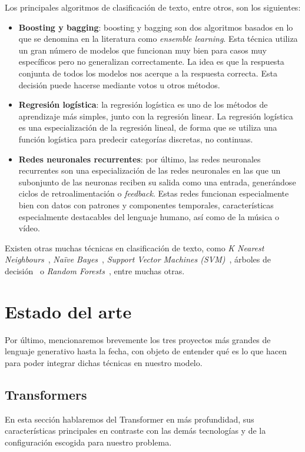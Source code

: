 Los principales algoritmos de clasificación de texto, entre otros, son los siguientes:

\begin{itemize}
    \item \textbf{Boosting y bagging}: boosting y bagging son dos algoritmos basados en lo que se denomina en la literatura como \textit{ensemble learning}. Esta técnica utiliza un gran número de modelos que funcionan muy bien para casos muy específicos pero no generalizan correctamente. La idea es que la respuesta conjunta de todos los modelos nos acerque a la respuesta correcta. Esta decisión puede hacerse mediante votos u otros métodos. \cite{Bauer2004AnEC}
    \item \textbf{Regresión logística}: la regresión logística es uno de los métodos de aprendizaje más simples, junto con la regresión linear. La regresión logística es una especialización de la regresión lineal, de forma que se utiliza una función logística para predecir categorías discretas, no continuas. \cite{CoxLogit1989}
    \item \textbf{Redes neuronales recurrentes}: por último, las redes neuronales recurrentes son una especialización de las redes neuronales en las que un subonjunto de las neuronas reciben su salida como una entrada, generándose ciclos de retroalimentación o \textit{feedback}. Estas redes funcionan especialmente bien con datos con patrones y componentes temporales, características especialmente destacables del lenguaje humano, así como de la música o vídeo. \cite{ZhouLSTM}
\end{itemize}


Existen otras muchas técnicas en clasificación de texto, como \textit{K Nearest Neighbours}~\cite{KNNXiao2007}, \textit{Naïve Bayes}~\cite{FrankNaive2006}, \textit{Support Vector Machines (SVM)}~\cite{SVMJoa1998}, árboles de decisión~\cite{DecisionTreeNoorman2018} o \textit{Random Forests}~\cite{breiman2001random}, entre muchas otras. 

\section{Estado del arte}

Por último, mencionaremos brevemente los tres proyectos más grandes de lenguaje generativo hasta la fecha, con objeto de entender qué es lo que hacen para poder integrar dichas técnicas en nuestro modelo.

\subsection{Transformers}
En esta sección hablaremos del Transformer en más profundidad, sus características principales en contraste con las demás tecnologías y de la configuración escogida para nuestro problema.

